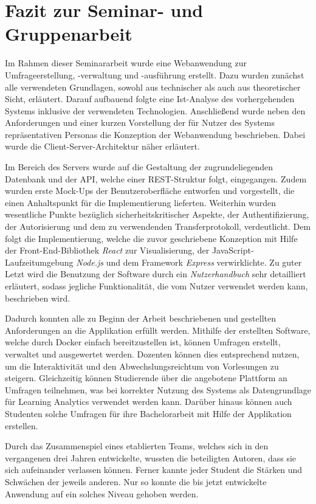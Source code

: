 \section{Fazit zur Seminar- und Gruppenarbeit}
\label{sec:Fazit}

Im Rahmen dieser Seminararbeit wurde eine Webanwendung zur Umfrageerstellung, -verwaltung und -ausführung erstellt.
Dazu wurden zunächst alle verwendeten Grundlagen, sowohl aus technischer als auch aus theoretischer Sicht, erläutert.
Darauf aufbauend folgte eine Ist-Analyse des vorhergehenden Systems inklusive der verwendeten Technologien.
Anschließend wurde neben den Anforderungen und einer kurzen Vorstellung der für Nutzer des Systems repräsentativen Personas die Konzeption der Webanwendung beschrieben.
Dabei wurde die Client-Server-Architektur näher erläutert.

Im Bereich des Servers wurde auf die Gestaltung der zugrundeliegenden Datenbank und der \ac{API}, welche einer \ac{REST}-Struktur folgt, eingegangen.
Zudem wurden erste Mock-Ups der Benutzeroberfläche entworfen und vorgestellt, die einen Anhaltspunkt für die Implementierung lieferten.
Weiterhin wurden wesentliche Punkte bezüglich sicherheitskritischer Aspekte, der Authentifizierung, der Autorisierung und dem zu verwendenden Transferprotokoll, verdeutlicht.
Dem folgt die Implementierung, welche die zuvor geschriebene Konzeption mit Hilfe der Front-End-Bibliothek \emph{React} zur Visualisierung, der JavaScript-Laufzeitumgebung \emph{Node.js} und dem Framework \emph{Express} verwirklichte.
Zu guter Letzt wird die Benutzung der Software durch ein \emph{Nutzerhandbuch} sehr detailliert erläutert, sodass jegliche Funktionalität, die vom Nutzer verwendet werden kann, beschrieben wird.

Dadurch konnten alle zu Beginn der Arbeit beschriebenen und gestellten Anforderungen an die Applikation erfüllt werden.
Mithilfe der erstellten Software, welche durch Docker einfach bereitzustellen ist, können Umfragen erstellt, verwaltet und ausgewertet werden.
Dozenten können dies entsprechend nutzen, um die Interaktivität und den Abwechslungsreichtum von Vorlesungen zu steigern.
Gleichzeitig können Studierende über die angebotene Plattform an Umfragen teilnehmen, was bei korrekter Nutzung des Systems als Datengrundlage für Learning Analytics verwendet werden kann.
Darüber hinaus können auch Studenten solche Umfragen für ihre Bachelorarbeit mit Hilfe der Applikation erstellen.

Durch das Zusammenspiel eines etablierten Teams, welches sich in den vergangenen drei Jahren entwickelte, wussten die beteiligten Autoren, dass sie sich aufeinander verlassen können.
Ferner kannte jeder Student die Stärken und Schwächen der jeweils anderen.
Nur so konnte die bis jetzt entwickelte Anwendung auf ein solches Niveau gehoben werden.

